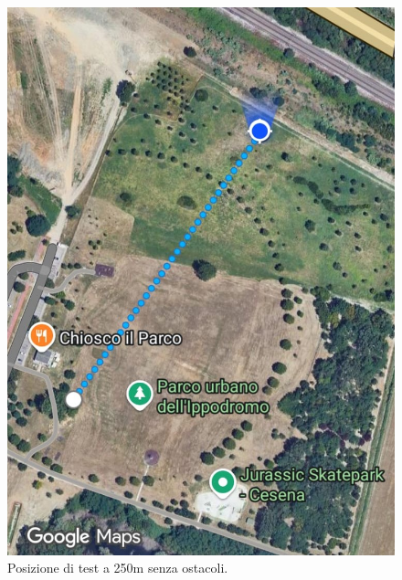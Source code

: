 \documentclass[12pt,a4paper,twoside]{book}
\begin{document}
\begin{figure}[H]
\begin{minipage}{0.32\textwidth}
        \includegraphics[width=\textwidth]{img/tests/T1/sat/10-250-direct.jpeg}
        \caption{Posizione di test a 250m senza ostacoli.}
        \label{fig:throughput-test-10-250m-direct}
    \end{minipage}
    \hfill
    \begin{minipage}{0.32\textwidth}
        \centering

\end{minipage}
\end{figure}
\end{document}
